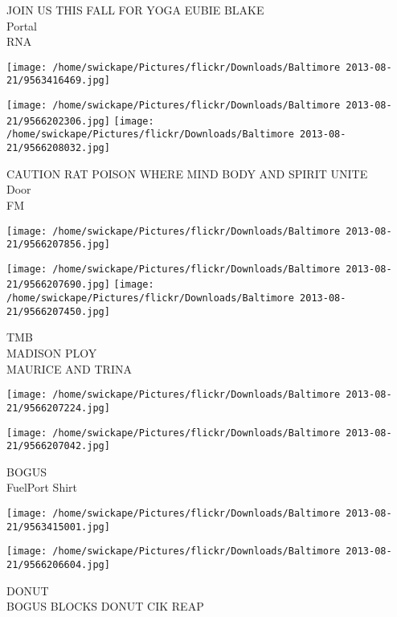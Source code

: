 \documentclass[10pt,letterpaper]{article}
\begin{document}
JOIN US THIS FALL FOR YOGA EUBIE BLAKE\\
Portal\\
RNA\\
\pagebreak

\texttt{[image: /home/swickape/Pictures/flickr/Downloads/Baltimore 2013-08-21/9563416469.jpg]}

\vspace{0.25in}
\texttt{[image: /home/swickape/Pictures/flickr/Downloads/Baltimore 2013-08-21/9566202306.jpg]}
\texttt{[image: /home/swickape/Pictures/flickr/Downloads/Baltimore 2013-08-21/9566208032.jpg]}

CAUTION RAT POISON WHERE MIND BODY AND SPIRIT UNITE\\
Door\\
FM\\
\pagebreak

\texttt{[image: /home/swickape/Pictures/flickr/Downloads/Baltimore 2013-08-21/9566207856.jpg]}

\vspace{0.25in}
\texttt{[image: /home/swickape/Pictures/flickr/Downloads/Baltimore 2013-08-21/9566207690.jpg]}
\texttt{[image: /home/swickape/Pictures/flickr/Downloads/Baltimore 2013-08-21/9566207450.jpg]}

TMB\\
MADISON PLOY\\
MAURICE AND TRINA\\
\pagebreak

\texttt{[image: /home/swickape/Pictures/flickr/Downloads/Baltimore 2013-08-21/9566207224.jpg]}

\vspace{0.25in}
\texttt{[image: /home/swickape/Pictures/flickr/Downloads/Baltimore 2013-08-21/9566207042.jpg]}

BOGUS\\
FuelPort Shirt\\
\pagebreak

\texttt{[image: /home/swickape/Pictures/flickr/Downloads/Baltimore 2013-08-21/9563415001.jpg]}

\vspace{0.25in}
\texttt{[image: /home/swickape/Pictures/flickr/Downloads/Baltimore 2013-08-21/9566206604.jpg]}

DONUT\\
BOGUS BLOCKS DONUT CIK REAP\\
\pagebreak
\end{document}
